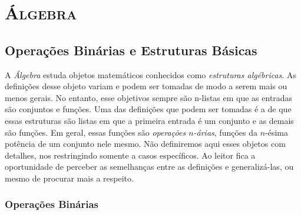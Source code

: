 
\part{{\scshape Álgebra}}

\chapter{Operações Binárias e Estruturas Básicas}

A \emph{Álgebra} estuda objetos matemáticos conhecidos como \emph{estruturas algébricas}. As definições desse objeto variam e podem ser tomadas de modo a serem mais ou menos gerais. No entanto, esse objetivos sempre são n-listas em que as entradas são conjuntos e funções. Uma das definições que podem ser tomadas é a de que essas estruturas são listas em que a primeira entrada é um conjunto e as demais são funções. Em geral, essas funções são \emph{operações $n$-árias}, funções da $n$-ésima potência de um conjunto nele mesmo. Não definiremos aqui esses objetos com detalhes, nos restringindo somente a casos específicos. Ao leitor fica a oportunidade de perceber as semelhanças entre as definições e generalizá-las, ou mesmo de procurar mais a respeito.

\section{Operações Binárias}

